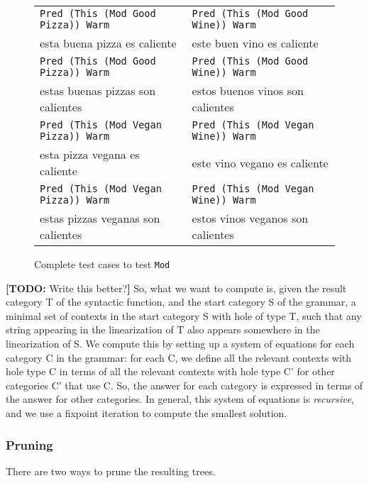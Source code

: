 \documentclass[runningheads]{llncs}
\def\t#1{\texttt{#1}}
\newcommand{\todo}[1]{{\color{cyan}\textbf{[TODO: }#1\textbf{]}}}
\begin{document}
\begin{figure}
\centering
\centering
\begin{tabular}{| l | l |}
\hline
\t{Pred (This (Mod Good Pizza)) Warm} & \t{Pred (This (Mod Good Wine))
                                        Warm} \\ 
esta buena pizza es caliente          & este buen vino es caliente \\ \hline
\t{Pred (This (Mod Good Pizza)) Warm} & \t{Pred (This (Mod Good Wine))
                                        Warm} \\ 
estas buenas pizzas son calientes          & estos buenos vinos son calientes \\ \hline
\t{Pred (This (Mod Vegan Pizza)) Warm} & \t{Pred (This (Mod Vegan Wine))
                                        Warm} \\ 
esta pizza vegana es caliente          & este vino vegano es caliente \\ \hline
\t{Pred (This (Mod Vegan Pizza)) Warm} & \t{Pred (This (Mod Vegan Wine))
                                        Warm} \\ 
estas pizzas veganas son calientes          & estos vinos veganos son calientes \\ \hline
\end{tabular}
\caption{Complete test cases to test \t{Mod}}
\label{fig:testCases}
\end{figure}

\todo{Write this better?} So, what we want to compute is, given the result category T of the syntactic function, and the start category S of the grammar, a minimal set of contexts in the start category S with hole of type T, such that any string appearing in the linearization of T also appears somewhere in the linearization of S. We compute this by setting up a system of equations for each category C in the grammar: for each C, we define all the relevant contexts with hole type C in terms of all the relevant contexts with hole type C' for other categories C' that use C. So, the answer for each category is expressed in terms of the answer for other categories. In general, this system of equations is \emph{recursive}, and we use a fixpoint iteration to compute the smallest solution.

\subsubsection{Pruning} 
There are two ways to prune the resulting trees.
\end{document}
